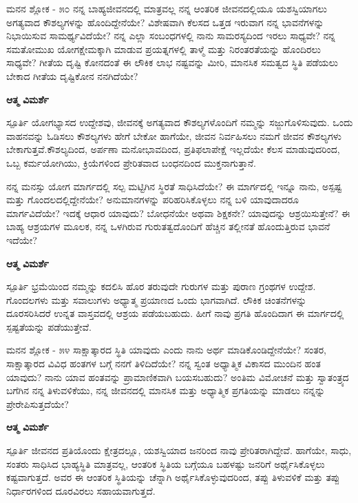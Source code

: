 \newpage
\begin{mananam}{\mananamfont ಮನನ ಶ್ಲೋಕ - ೫೦}
\small \mananatext ನನ್ನ ಬಾಹ್ಯಜೀವನದಲ್ಲಿ ಮಾತ್ರವಲ್ಲ ನನ್ನ ಆಂತರಿಕ ಜೀವನದಲ್ಲಿಯೂ ಯಶಸ್ವಿಯಾಗಲು ಅಗತ್ಯವಾದ ಕೌಶಲ್ಯಗಳನ್ನು ಹೊಂದಿದ್ದೇನೆಯೇ? ವಿಶೇಷವಾಗಿ ಕೆಲಸದ ಒತ್ತಡ ಇರುವಾಗ ನನ್ನ ಭಾವನೆಗಳನ್ನು ನಿಭಾಯಿಸುವ ಸಾಮರ್ಥ್ಯವಿದೆಯೇ? ನನ್ನ ಎಲ್ಲಾ ಸಂಬಂಧಗಳಲ್ಲಿ ನಾನು  ಸಾಮರಸ್ಯದಿಂದ ಇರಲು ಸಾಧ್ಯವೇ? ನನ್ನ ಸಮತೋಮುಖ ಯೋಗಕ್ಷೇಮಕ್ಕಾಗಿ ಮಾಡುವ ಪ್ರಯತ್ನಗಳಲ್ಲಿ ತಾಳ್ಮೆ ಮತ್ತು ನಿರಂತರತೆಯನ್ನು ಹೊಂದಿರಲು ಸಾಧ್ಯವೇ? ಗೀತೆಯ ದೃಷ್ಟಿ ಕೋನದಂತೆ ಈ ಲೌಕಿಕ ಲಾಭ ನಷ್ಟವನ್ನು ಮೀರಿ, ಮಾನಸಿಕ ಸಮತ್ವದ ಸ್ಥಿತಿ ಪಡೆಯಲು ಬೇಕಾದ ಗೀತೆಯ ದೃಷ್ಟಿಕೋನ ನನಗಿದೆಯೇ?
\end{mananam}
\WritingHand\enspace\textbf{ಆತ್ಮ ವಿಮರ್ಶೆ}
\begin{inspiration}{\mananamfont ಸ್ಪೂರ್ತಿ}
\small \mananatext ಯೋಗಭ್ಯಾಸದ ಉದ್ದೇಶವು, ಜೀವನಕ್ಕೆ ಅಗತ್ಯವಾದ ಕೌಶಲ್ಯಗಳೊಂದಿಗೆ ನಮ್ಮನ್ನು ಸಜ್ಜುಗೊಳಿಸುವುದು. ಒಂದು ವಾಹನವನ್ನು ಓಡಿಸಲು ಕೌಶಲ್ಯಗಳು ಹೇಗೆ ಬೇಕೋ ಹಾಗೆಯೇ, ಜೀವನ ನಿರ್ವಹಿಸಲು ನಮಗೆ ಜೀವನ ಕೌಶಲ್ಯಗಳು ಬೇಕಾಗುತ್ತವೆ.ಕೌಶಲ್ಯದಿಂದ, ಅರ್ಪಣಾ ಮನೋಭಾವದಿಂದ, ಪ್ರತಿಫಲಾಪೇಕ್ಷೆ ಇಲ್ಲದೆಯೇ ಕೆಲಸ ಮಾಡುವುದರಿಂದ, ಒಬ್ಬ ಕರ್ಮಯೋಗಿಯು, ಕ್ರಿಯೆಗಳಿಂದ ಪ್ರೇರಿತವಾದ ಬಂಧನದಿಂದ ಮುಕ್ತನಾಗುತ್ತಾನೆ.
\end{inspiration}
\newpage



\newpage
\begin{mananam}{}
\small \mananatext ನನ್ನ ಮನಸ್ಸು ಯೋಗ ಮಾರ್ಗದಲ್ಲಿ ಸಲ್ಪ ಮಟ್ಟಿಗಿನ ಸ್ಥಿರತೆ ಸಾಧಿಸಿದೆಯೇ? ಈ ಮಾರ್ಗದಲ್ಲಿ ಇನ್ನೂ ನಾನು, ಅಸ್ಪಷ್ಟ  ಮತ್ತು ಗೊಂದಲದಲ್ಲಿದ್ದೇನೆಯೇ? ಅನುಮಾನಗಳನ್ನು ಪರಿಹರಿಸಿಕೊಳ್ಳಲು ನನ್ನ ಬಳಿ ಯಾವುದಾದರೂ ಮಾರ್ಗವಿದೆಯೇ? ಇದಕ್ಕೆ ಆಧಾರ ಯಾವುದು? ಬೋಧನೆಯೇ ಅಥವಾ ಶಿಕ್ಷಕನೇ? ಯಾವುದನ್ನು ಆಶ್ರಯಿಸುತ್ತೇನೆ? ಈ ಬಾಹ್ಯ ಆಶ್ರಯಗಳ ಮೂಲಕ, ನನ್ನ ಒಳಗಿರುವ ಗುರುತತ್ವದೊಂದಿಗೆ ಹೆಚ್ಚಿನ ತಲ್ಲೀನತೆ ಹೊಂದುತ್ತಿರುವ ಭಾವನೆ ಇದೆಯೇ?
\end{mananam}
\WritingHand\enspace\textbf{ಆತ್ಮ ವಿಮರ್ಶೆ}
\begin{inspiration}{\mananamfont ಸ್ಪೂರ್ತಿ}
\small \mananatext ಭ್ರಮೆಯಿಂದ ನಮ್ಮನ್ನು ಕದಲಿಸಿ ಹೊರ ತರುವುದೇ ಗುರುಗಳ ಮತ್ತು ಪುರಾಣ ಗ್ರಂಥಗಳ ಉದ್ದೇಶ. ಗೊಂದಲಗಳು ಮತ್ತು ಸವಾಲುಗಳು ಅಧ್ಯಾತ್ಮ ಪ್ರಯಾಣದ ಒಂದು ಭಾಗವಾಗಿದೆ. ಲೌಕಿಕ ಚಿಂತನೆಗಳನ್ನು ದೂರಸರಿಸಿದರೆ ಉನ್ನತ ವಾಸ್ತವದಲ್ಲಿ ಆಶ್ರಯ ಪಡೆಯಬಹುದು. ಹೀಗೆ ನಾವು ಪ್ರಗತಿ ಹೊಂದಿದಾಗ ಈ ಮಾರ್ಗದಲ್ಲಿ ಸ್ಪಷ್ಟತೆಯನ್ನು ಪಡೆಯುತ್ತೇವೆ.
\end{inspiration}
\newpage


\newpage
\begin{mananam}{\mananamfont ಮನನ ಶ್ಲೋಕ - ೫೪}
\small \mananatext ಸಾಕ್ಷಾತ್ಕಾರದ ಸ್ಥಿತಿ ಯಾವುದು ಎಂದು ನಾನು ಅರ್ಥ ಮಾಡಿಕೊಂಡಿದ್ದೇನೆಯೇ? ಸಂತರ,  ಸಾಕ್ಷಾತ್ಕಾರದ  ವಿವಿಧ ಹಂತಗಳ ಬಗ್ಗೆ ನನಗೆ ತಿಳಿದಿದೆಯೇ? ನನ್ನ ಸ್ವಂತ ಅಧ್ಯಾತ್ಮಿಕ ವಿಕಾಸದ ಮುಂದಿನ ಹಂತ ಯಾವುದು? ನಾನು ಯಾವ ಹಂತವನ್ನು ಪ್ರಾಮಾಣಿಕವಾಗಿ ಬಯಸಬಹುದು? ಅಂತಿಮ ವಿಮೋಚನೆ ಮತ್ತು ಸ್ವಾತಂತ್ರ್ಯದ ಬಗೆಗಿನ ನನ್ನ ತಿಳುವಳಿಕೆಯು,  ನನ್ನ ಜೀವನದಲ್ಲಿ ಮಾನಸಿಕ ಮತ್ತು ಅಧ್ಯಾತ್ಮಿಕ ಪ್ರಗತಿಯನ್ನು ಮಾಡಲು  ನನ್ನನ್ನು ಪ್ರೇರೇಪಿಸುತ್ತದೆಯೇ?
\end{mananam}
\WritingHand\enspace\textbf{ಆತ್ಮ ವಿಮರ್ಶೆ}
\begin{inspiration}{\mananamfont ಸ್ಪೂರ್ತಿ}
\small \mananatext ಜೀವನದ ಪ್ರತಿಯೊಂದು ಕ್ಷೇತ್ರದಲ್ಲೂ,  ಯಶಸ್ವಿಯಾದ ಜನರಿಂದ ನಾವು ಪ್ರೇರಿತರಾಗಿದ್ದೇವೆ. ಹಾಗೆಯೇ, ಸಾಧು, ಸಂತರು ಸಾಧಿಸಿದ ಭಾಹ್ಯಸ್ಥಿತಿ ಮಾತ್ರವಲ್ಲ, ಆಂತರಿಕ ಸ್ಥಿತಿಯ ಬಗ್ಗೆಯೂ ಬಹಳಷ್ಟು ಜನರಿಗೆ ಅರ್ಥೈಸಿಕೊಳ್ಳಲು ಕಷ್ಟವಾಗುತ್ತದೆ. ಅವರ ಈ ಆಂತರಿಕ ಸ್ಥಿತಿಯನ್ನು ಚೆನ್ನಾಗಿ ಅರ್ಥೈಸಿಕೊಳ್ಳುವುದರಿಂದ, ತಪ್ಪು ತಿಳುವಳಿಕೆ ಮತ್ತು ತಪ್ಪು ನಿರ್ಧಾರಗಳಿಂದ ದೂರವಿರಲು ಸಹಾಯವಾಗುತ್ತದೆ.
\end{inspiration}
\newpage



